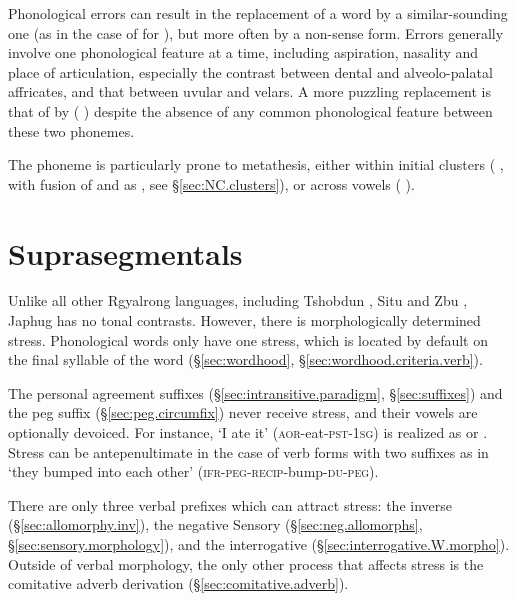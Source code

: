 Phonological errors can result in the replacement of a word by a similar-soun\-ding one (as in the case of  for ), but more often by a non-sense form. Errors generally involve one phonological feature at a time, including aspiration, nasality and place of articulation, especially the contrast between dental and alveolo-palatal affricates, and that between uvular and velars. A more puzzling replacement is that of  by  ( \fl{} ) despite the absence of any common phonological feature between these two phonemes.

The phoneme  is particularly prone to metathesis, either within initial clusters ( \fl{} , with fusion of  and  as , see §\ref{sec:NC.clusters}), or across vowels ( \fl{} ).


\section{Suprasegmentals} \label{sec:stress}
Unlike all other Rgyalrong languages, including Tshobdun \citep{jackson05yingao}, Situ \citep{linyj12tone} and Zbu  \citep{gong18these}, Japhug has no tonal contrasts. However, there is morphologically determined stress. Phonological words only have one stress, which is located by default on the final syllable of the word (§\ref{sec:wordhood}, §\ref{sec:wordhood.criteria.verb}). 

The personal agreement suffixes (§\ref{sec:intransitive.paradigm}, §\ref{sec:suffixes}) and the peg suffix  (§\ref{sec:peg.circumfix}) never receive stress, and their vowels are optionally devoiced. For instance,  `I ate it' (\textsc{aor}-eat-\textsc{pst}-\textsc{1sg}) is realized as  or . Stress can be antepenultimate in the case of verb forms with two suffixes as in  `they bumped into each other' (\textsc{ifr}-\textsc{peg}-\textsc{recip}-bump-\textsc{du}-\textsc{peg}).

There are only three verbal prefixes which can attract stress: the inverse  (§\ref{sec:allomorphy.inv}), the negative Sensory  (§\ref{sec:neg.allomorphs}, §\ref{sec:sensory.morphology}), and the interrogative  (§\ref{sec:interrogative.W.morpho}). Outside of verbal morphology, the only other process that affects stress is the comitative adverb derivation (§\ref{sec:comitative.adverb}).

